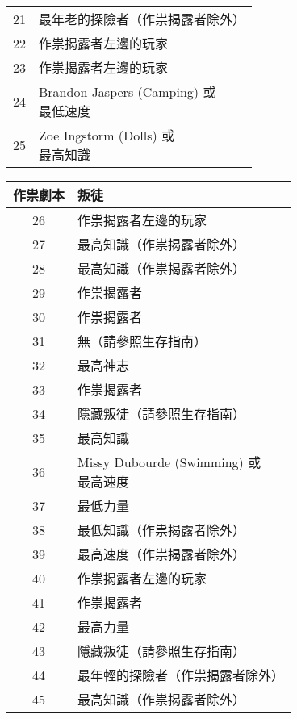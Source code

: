 \begin{center}
\begin{minipage}[t]{.45\textwidth}
\begin{tabular}[t]{ c l }
        21 & 最年老的探險者（作祟揭露者除外） \\
        22 & 作祟揭露者左邊的玩家 \\
        23 & 作祟揭露者左邊的玩家 \\
        24 & \makecell[tl]{Brandon Jaspers (Camping) 或 \\ 最低速度} \\
        25 & \makecell[tl]{Zoe Ingstorm (Dolls) 或 \\ 最高知識} \\
    \end{tabular}
  \end{minipage}\hfil
  \begin{minipage}[t]{.45\textwidth}
    \renewcommand{\arraystretch}{1.5}
    \begin{tabular}[t]{ c l }
      \toprule
        \bfseries 作祟劇本 & \bfseries 叛徒 \\[.5ex]
      \midrule
        26 & 作祟揭露者左邊的玩家 \\
        27 & 最高知識（作祟揭露者除外） \\
        28 & 最高知識（作祟揭露者除外） \\
        29 & 作祟揭露者 \\
        30 & 作祟揭露者 \\

        31 & 無（請參照生存指南）\\
        32 & 最高神志 \\
        33 & 作祟揭露者 \\
        34 & 隱藏叛徒（請參照生存指南） \\
        35 & 最高知識 \\

        36 & \makecell[tl]{Missy Dubourde (Swimming) 或 \\ 最高速度} \\
        37 & 最低力量 \\
        38 & 最低知識（作祟揭露者除外） \\
        39 & 最高速度（作祟揭露者除外） \\
        40 & 作祟揭露者左邊的玩家 \\

        41 & 作祟揭露者 \\
        42 & 最高力量 \\
        43 & 隱藏叛徒（請參照生存指南） \\
        44 & 最年輕的探險者（作祟揭露者除外） \\
        45 & 最高知識（作祟揭露者除外） \\


\end{tabular}
\end{minipage}
\end{center}
